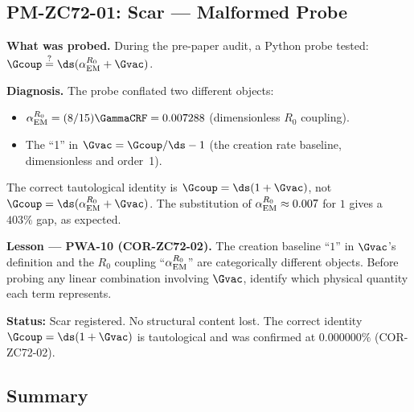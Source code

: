 \documentclass[12pt, a4paper]{article}
\renewcommand{\aEM}{\alpha_{\rm EM}}
\begin{document}
\subsection{PM-ZC72-01: Scar --- Malformed Probe}
\label{sec:pm}

\begin{derivedbox}[title={PM-ZC72-01: Probe $\Gcoup = \ds(\aEM^{R_0}
  + \Gvac)$ Gave Gap $403\%$ --- Malformed (Failure Stance)}]

\textbf{What was probed.}
During the pre-paper audit, a Python probe tested:
$\Gcoup \stackrel{?}{=} \ds(\aEM^{R_0} + \Gvac)$.

\textbf{Diagnosis.}
The probe conflated two different objects:
\begin{itemize}[leftmargin=2em, noitemsep]
  \item $\aEM^{R_0} = (8/15)\GammaCRF = 0.007288$
    (dimensionless $R_0$ coupling).
  \item The ``1'' in $\Gvac = \Gcoup/\ds - 1$
    (the creation rate baseline, dimensionless and order~1).
\end{itemize}
The correct tautological identity is
$\Gcoup = \ds(1 + \Gvac)$, not
$\Gcoup = \ds(\aEM^{R_0} + \Gvac)$.
The substitution of $\aEM^{R_0} \approx 0.007$ for $1$ gives
a $403\%$ gap, as expected.

\textbf{Lesson --- PWA-10 (COR-ZC72-02).}
The creation baseline ``$1$'' in $\Gvac$'s definition and
the $R_0$ coupling ``$\aEM^{R_0}$'' are categorically different
objects.
Before probing any linear combination involving $\Gvac$,
identify which physical quantity each term represents.

\textbf{Status:} Scar registered. No structural content lost.
The correct identity $\Gcoup = \ds(1+\Gvac)$ is tautological
and was confirmed at $0.000000\%$ (COR-ZC72-02).
\end{derivedbox}

\subsection{Summary}
\label{sec:summary}
\end{document}
